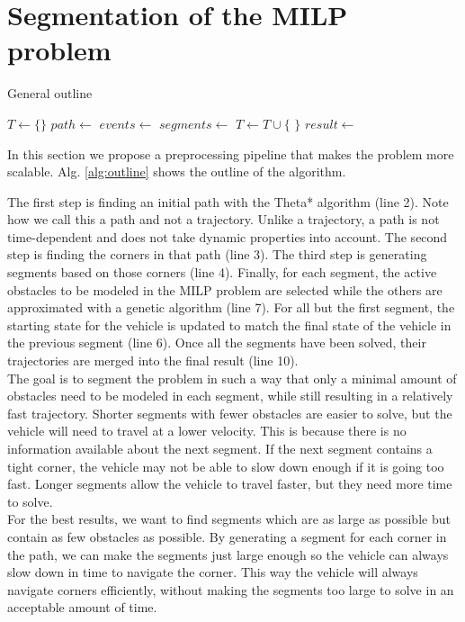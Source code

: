 \section{Segmentation of the MILP problem}
\label{section:segment}
\begin{algorithm}
\caption{General outline}
\label{alg:outline}
\begin{algorithmic}[1]
\State $T \leftarrow \{\}$ 
\State $path \leftarrow$ 
\State $events \leftarrow$ 
\State $segments \leftarrow$ 
\State {}
\State {}
\State $T \leftarrow T \cup \{$  $\}$
\EndFor
\State $result \leftarrow $
\end{algorithmic}
\end{algorithm}
In this section we propose a preprocessing pipeline that makes the problem more scalable. Alg. \ref{alg:outline} shows the outline of the algorithm.

The first step is finding an initial path with the Theta* algorithm (line 2). Note how we call this a path and not a trajectory. Unlike a trajectory, a path is not time-dependent and does not take dynamic properties into account. The second step is finding the corners in that path (line 3). The third step is generating segments based on those corners (line 4). Finally, for each segment, the active obstacles to be modeled in the MILP problem are selected while the others are approximated with a genetic algorithm (line 7). For all but the first segment, the starting state for the vehicle is updated to match the final state of the vehicle in the previous segment (line 6). Once all the segments have been solved, their trajectories are merged into the final result (line 10).\\
The goal is to segment the problem in such a way that only a minimal amount of obstacles need to be modeled in each segment, while still resulting in a relatively fast trajectory. Shorter segments with fewer obstacles are easier to solve, but the vehicle will need to travel at a lower velocity. This is because there is no information available about the next segment. If the next segment contains a tight corner, the vehicle may not be able to slow down enough if it is going too fast. Longer segments allow the vehicle to travel faster, but they need more time to solve.\\
For the best results, we want to find segments which are as large as possible but contain as few obstacles as possible. By generating a segment for each corner in the path, we can make the segments just large enough so the vehicle can always slow down in time to navigate the corner. This way the vehicle will always navigate corners  efficiently, without making the segments too large to solve in an acceptable amount of time.
